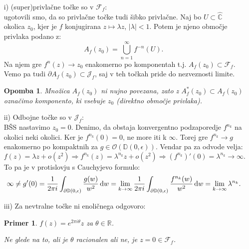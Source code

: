 \documentclass{article}
\newtheorem{opomba}{Opomba}
\newtheorem{primer}{Primer}
\newcommand{\C}{\mathbb{C}}
\newcommand{\D}{\mathbb{D}}
\newcommand{\F}{\mathcal{F}}
\newcommand{\R}{\mathbb{R}}
\newcommand{\Ho}{\mathcal{O}}
\begin{document}
\begin{enumerate}
    \item[i)] (super)privlačne točke so v $\F_f$: \\
    ugotovili smo, da so privlačne točke tudi šibko privlačne. Naj bo 
    $U \subset \hat{\C}$ okolica $z_0$, kjer je $f$ konjugirana $z \mapsto \lambda z$, 
    $|\lambda| < 1$. Potem je njeno območje privlaka podano z: 
    $$
    A_f(z_0) = \bigcup_{n=1}^\infty f^{-n}(U). 
    $$
    Na njem gre $f^n(z) \rightarrow z_0$ enakomerno po komponentah t.j. 
    $A_f(z_0) \subset \F_f$. Vemo pa tudi $\partial A_f(z_0) \subset \mathcal{J}_f$, 
    saj v teh točkah pride do nezveznosti limite.
    \begin{opomba}
    Množica $A_f(z_0)$ ni nujno povezana, zato z $A^*_f(z_0) \subset A_f(z_0)$
    označimo komponento, ki vsebuje $z_0$ (direktno območje privlaka).
    \end{opomba}
    \item[ii)] Odbojne točke so v $\mathcal{J}_f$: \\
    BŠS nastavimo $z_0 = 0$. Denimo, da obstaja konvergentno podzaporedje $f^{n_k}$
    na okolici neki okolici. Ker je $f^{n_k}(0) = 0$, ne more iti k $\infty$. Torej gre 
    $f^{n_k} \rightarrow g$ enakomerno po kompaktnih za $g\in \Ho(\D(0, \epsilon))$. 
    Vendar pa za odvode velja: 
    $$
    f(z) = \lambda z + o(z^2) \Longrightarrow f^{n_k}(z) = \lambda^{n_k} z + o(z^2) \Longrightarrow
    (f^{n_k})'(0) = \lambda^{n_k} \rightarrow \infty.
    $$
    To pa je v protislovju s Cauchyjevo formulo: 
    $$
    \infty \neq g'(0) = \frac{1}{2\pi i} \int_{\partial \D(0, \epsilon)} \frac{g(w)}{w^2} \dif w 
    = \lim_{k\rightarrow \infty} \frac{1}{2\pi i} \int_{\partial \D(0, \epsilon)} \frac{f^{n_k}(w)}{w^2} \dif w 
    = \lim_{k\rightarrow \infty} \lambda^{n_k}.
    $$
    \item[iii)] Za nevtralne točke ni enoličnega odgovoro:
    \begin{primer}
        $f(z) = e^{2\pi i \theta}z$ za $\theta \in \R$.
    \begin{center}
        \end{center}
        Ne glede na to, ali je $\theta$ racionalen ali ne, je $z = 0 \in \F_f$.
    \end{primer}


\end{enumerate}
\end{document}

